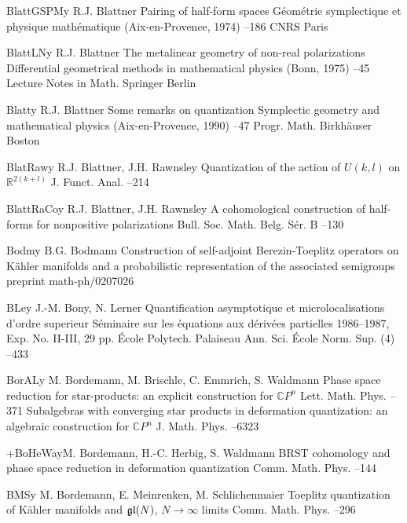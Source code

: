 \documentclass[12pt]{amsart}
\numberwithin{equation}{section}
\theoremstyle{remark}
\newcommand\RR{\mathbb R}
\newcommand{\CC}{\C}
\newcommand{\by}{\mathbf y}
\newcommand{\C}{\mathbb C}
\begin{document}
\begin{thebibliography}{199}
 BlattGSPM\by{ R.J. Blattner \paper Pairing of half-form spaces \inbook
G\'eom\'etrie symplectique et physique math\'ematique (Aix-en-Provence, 1974)
--186 \publ CNRS \publaddr Paris }

 BlattLN\by{ R.J. Blattner \paper The metalinear geometry of non-real
polarizations \inbook Differential geometrical methods in mathematical physics
(Bonn, 1975) --45 \bookinfo Lecture Notes in Math.  \publ
Springer \publaddr Berlin }

 Blatt\by{ R.J. Blattner \paper Some remarks on quantization \inbook
Symplectic geometry and mathematical physics (Aix-en-Provence, 1990) --47 \bookinfo Progr. Math.  \publ Birkh\"auser \publaddr Boston
}

 BlatRaw\by{ R.J. Blattner, J.H. Rawnsley \paper Quantization of the
action of $U(k,l)$ on $\RR^{2(k+l)}$ \jour J. Funct. Anal.  
--214}

 BlattRaCo\by{ R.J. Blattner, J.H. Rawnsley \paper A cohomological
construction of half-forms for nonpositive polarizations \jour Bull. Soc. Math.
Belg. S\'er. B   --130}

 Bodm\by{ B.G. Bodmann \paper Construction of self-adjoint
Berezin-Toeplitz operators on K\"ahler manifolds and a probabilistic
representation of the associated semigroups \paperinfo preprint
math-ph/0207026}

 BLe\by{ J.-M. Bony, N. Lerner \paper Quantification asymptotique et
microlocalisations d'ordre superieur \jour S\'eminaire sur les \'equations aux
d\'eriv\'ees partielles 1986--1987, Exp. No. II-III, 29 pp. \publ \'Ecole
Polytech. \publaddr Palaiseau  \moreref \jour Ann. Sci. \'Ecole Norm.
Sup. (4)   --433}

 BorAL\by{ M. Bordemann, M. Brischle, C. Emmrich, S. Waldmann \paper
Phase space reduction for star-products: an explicit construction for $\CC P^n$
\jour Lett. Math. Phys.   --371 \moreref \paper
Subalgebras with converging star products in deformation quantization: an
algebraic construction for $\CC P^n$ \jour J. Math. Phys.  
--6323}

 +BoHeWa\by{M. Bordemann, H.-C. Herbig, S. Waldmann \paper BRST cohomology
and phase space reduction in deformation quantization \jour Comm. Math. Phys.
  --144}

 BMS\by{ M. Bordemann, E. Meinrenken, M. Schlichenmaier \paper Toeplitz
quantization of K\"ahler manifolds and $\frak g\frak l (N)$, $N\to\infty$
limits \jour Comm. Math. Phys.   --296}


\end{thebibliography}
\end{document}
